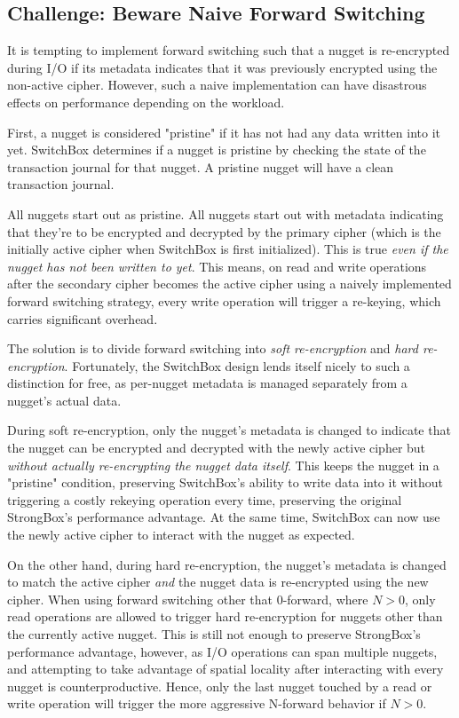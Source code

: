 \subsection{Challenge: Beware Naive Forward Switching}

It is tempting to implement forward switching such that a nugget is re-encrypted
during I/O if its metadata indicates that it was previously encrypted using the
non-active cipher. However, such a naive implementation can have disastrous
effects on performance depending on the workload.

First, a nugget is considered "pristine" if it has not had any data written into
it yet. SwitchBox determines if a nugget is pristine by checking the state of
the transaction journal for that nugget. A pristine nugget will have a clean
transaction journal.

All nuggets start out as pristine. All nuggets start out with metadata
indicating that they're to be encrypted and decrypted by the primary cipher
(which is the initially active cipher when SwitchBox is first initialized). This
is true \emph{even if the nugget has not been written to yet}. This means, on
read and write operations after the secondary cipher becomes the active cipher
using a naively implemented forward switching strategy, every write operation
will trigger a re-keying, which carries significant overhead.

The solution is to divide forward switching into \emph{soft re-encryption} and
\emph{hard re-encryption}. Fortunately, the SwitchBox design lends itself nicely
to such a distinction for free, as per-nugget metadata is managed separately
from a nugget's actual data.

During soft re-encryption, only the nugget's metadata is changed to indicate
that the nugget can be encrypted and decrypted with the newly active cipher but
\emph{without actually re-encrypting the nugget data itself}. This keeps the
nugget in a "pristine" condition, preserving SwitchBox's ability to write data
into it without triggering a costly rekeying operation every time, preserving
the original StrongBox's performance advantage. At the same time, SwitchBox can
now use the newly active cipher to interact with the nugget as expected.

On the other hand, during hard re-encryption, the nugget's metadata is changed
to match the active cipher \emph{and} the nugget data is re-encrypted using the
new cipher. When using forward switching other that 0-forward, 
where $N > 0$, only read operations are allowed to trigger hard re-encryption
for nuggets other than the currently active nugget. This is still not enough to
preserve StrongBox's performance advantage, however, as I/O operations can span
multiple nuggets, and attempting to take advantage of spatial locality after
interacting with every nugget is counterproductive. Hence, only the last nugget
touched by a read or write operation will trigger the more aggressive N-forward
behavior if $N > 0$.

